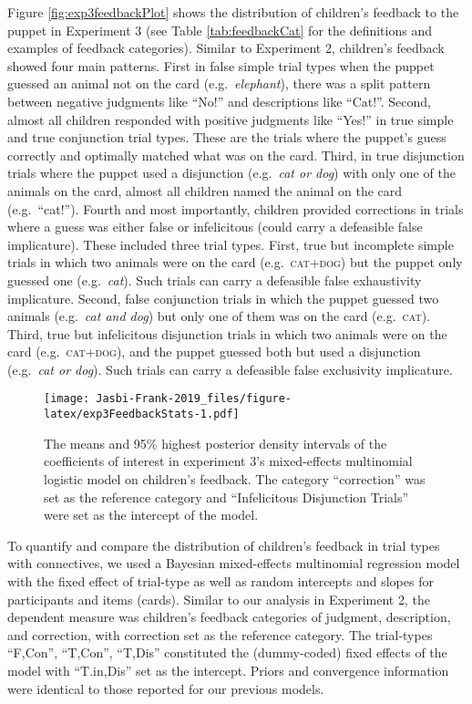 \documentclass[
  english,
  ,man,floatsintext]{apa6}
\begin{document}
Figure \ref{fig:exp3feedbackPlot} shows the distribution of children's feedback to the puppet in Experiment 3 (see Table \ref{tab:feedbackCat} for the definitions and examples of feedback categories). Similar to Experiment 2, children's feedback showed four main patterns. First in false simple trial types when the puppet guessed an animal not on the card (e.g.~\emph{elephant}), there was a split pattern between negative judgments like \enquote{No!} and descriptions like \enquote{Cat!}. Second, almost all children responded with positive judgments like \enquote{Yes!} in true simple and true conjunction trial types. These are the trials where the puppet's guess correctly and optimally matched what was on the card. Third, in true disjunction trials where the puppet used a disjunction (e.g.~\emph{cat or dog}) with only one of the animals on the card, almost all children named the animal on the card (e.g.~\enquote{cat!}). Fourth and most importantly, children provided corrections in trials where a guess was either false or infelicitous (could carry a defeasible false implicature). These included three trial types. First, true but incomplete simple trials in which two animals were on the card (e.g.~\textsc{cat+dog}) but the puppet only guessed one (e.g.~\emph{cat}). Such trials can carry a defeasible false exhaustivity implicature. Second, false conjunction trials in which the puppet guessed two animals (e.g.~\emph{cat and dog}) but only one of them was on the card (e.g.~\textsc{cat}). Third, true but infelicitous disjunction trials in which two animals were on the card (e.g.~\textsc{cat+dog}), and the puppet guessed both but used a disjunction (e.g.~\emph{cat or dog}). Such trials can carry a defeasible false exclusivity implicature.

\begin{figure}
\centering
\texttt{[image: Jasbi-Frank-2019\_files/figure-latex/exp3FeedbackStats-1.pdf]}
\caption{\label{fig:exp3FeedbackStats}The means and 95\% highest posterior density intervals of the coefficients of interest in experiment 3's mixed-effects multinomial logistic model on children's feedback. The category \enquote{correction} was set as the reference category and \enquote{Infelicitous Disjunction Trials} were set as the intercept of the model.}
\end{figure}

To quantify and compare the distribution of children's feedback in trial types with connectives, we used a Bayesian mixed-effects multinomial regression model with the fixed effect of trial-type as well as random intercepts and slopes for participants and items (cards). Similar to our analysis in Experiment 2, the dependent measure was children's feedback categories of judgment, description, and correction, with correction set as the reference category. The trial-types \enquote{F,Con}, \enquote{T,Con}, \enquote{T,Dis} constituted the (dummy-coded) fixed effects of the model with \enquote{T.in,Dis} set as the intercept. Priors and convergence information were identical to those reported for our previous models.
\end{document}
